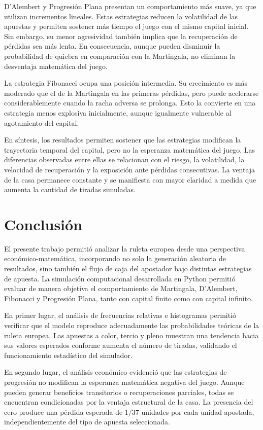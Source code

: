 \documentclass{article}
\begin{document}
D'Alembert y Progresión Plana presentan un comportamiento más suave, ya que utilizan incrementos lineales. Estas estrategias reducen la volatilidad de las apuestas y permiten sostener más tiempo el juego con el mismo capital inicial. Sin embargo, su menor agresividad también implica que la recuperación de pérdidas sea más lenta. En consecuencia, aunque pueden disminuir la probabilidad de quiebra en comparación con la Martingala, no eliminan la desventaja matemática del juego.

La estrategia Fibonacci ocupa una posición intermedia. Su crecimiento es más moderado que el de la Martingala en las primeras pérdidas, pero puede acelerarse considerablemente cuando la racha adversa se prolonga. Esto la convierte en una estrategia menos explosiva inicialmente, aunque igualmente vulnerable al agotamiento del capital.

En síntesis, los resultados permiten sostener que las estrategias modifican la trayectoria temporal del capital, pero no la esperanza matemática del juego. Las diferencias observadas entre ellas se relacionan con el riesgo, la volatilidad, la velocidad de recuperación y la exposición ante pérdidas consecutivas. La ventaja de la casa permanece constante y se manifiesta con mayor claridad a medida que aumenta la cantidad de tiradas simuladas.

\newpage

\section{Conclusión}

El presente trabajo permitió analizar la ruleta europea desde una perspectiva económico-matemática, incorporando no solo la generación aleatoria de resultados, sino también el flujo de caja del apostador bajo distintas estrategias de apuesta. La simulación computacional desarrollada en Python permitió evaluar de manera objetiva el comportamiento de Martingala, D'Alembert, Fibonacci y Progresión Plana, tanto con capital finito como con capital infinito.

En primer lugar, el análisis de frecuencias relativas e histogramas permitió verificar que el modelo reproduce adecuadamente las probabilidades teóricas de la ruleta europea. Las apuestas a color, tercio y pleno muestran una tendencia hacia sus valores esperados conforme aumenta el número de tiradas, validando el funcionamiento estadístico del simulador.

En segundo lugar, el análisis económico evidenció que las estrategias de progresión no modifican la esperanza matemática negativa del juego. Aunque pueden generar beneficios transitorios o recuperaciones parciales, todas se encuentran condicionadas por la ventaja estructural de la casa. La presencia del cero produce una pérdida esperada de $1/37$ unidades por cada unidad apostada, independientemente del tipo de apuesta seleccionada.
\end{document}
